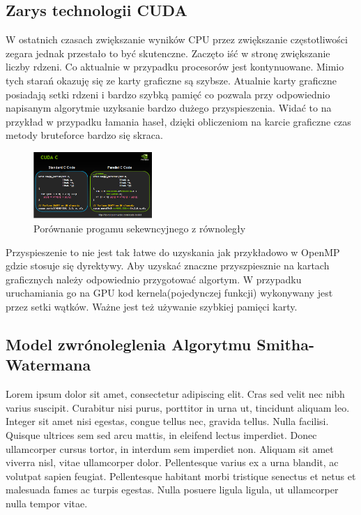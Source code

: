 \documentclass[a4paper,12pt]{article}
\begin{document}
\subsection*{Zarys technologii CUDA}
W ostatnich czasach zwiększanie wyników CPU przez zwiększanie częstotliwości zegara jednak przestało to być skutenczne. Zaczęto iść w stronę zwiększanie liczby rdzeni. Co aktualnie w przypadku procesorów jest kontynuowane. Mimio tych starań okazuję się ze karty graficzne są szybsze.
	Atualnie karty graficzne posiadają setki rdzeni i bardzo szybką pamięć co pozwala przy odpowiednio napisanym algorytmie uzyksanie bardzo dużego przyspieszenia. Widać to na przykład w przypadku łamania haseł, dzięki obliczeniom na karcie graficzne czas metody bruteforce bardzo się skraca. 
\begin{figure}[h]
  \vspace{5pt}
  \centering
  \begin{center}
  \includegraphics[width=0.4\textwidth]{images/cuda.png}
  \end{center}
  \caption{Porównanie progamu sekewncyjnego z równoległy }
 \end{figure}
 Przyspieszenie to nie jest tak łatwe do uzyskania jak przykładowo w OpenMP gdzie stosuje się dyrektywy. Aby uzyskać znaczne przyszpiesznie na kartach graficznych należy odpowiednio przygotować algortym. W przypadku uruchamiania go na GPU kod kernela(pojedynczej funkcji) wykonywany jest przez setki wątków. Ważne jest też używanie szybkiej pamięci karty.

\subsection*{Model zwrónoleglenia Algorytmu Smitha-Watermana}
Lorem ipsum dolor sit amet, consectetur adipiscing elit. Cras sed velit nec nibh varius suscipit. Curabitur nisi purus, porttitor in urna ut, tincidunt aliquam leo. Integer sit amet nisi egestas, congue tellus nec, gravida tellus. Nulla facilisi. Quisque ultrices sem sed arcu mattis, in eleifend lectus imperdiet. Donec ullamcorper cursus tortor, in interdum sem imperdiet non. Aliquam sit amet viverra nisl, vitae ullamcorper dolor. Pellentesque varius ex a urna blandit, ac volutpat sapien feugiat. Pellentesque habitant morbi tristique senectus et netus et malesuada fames ac turpis egestas. Nulla posuere ligula ligula, ut ullamcorper nulla tempor vitae.
\end{document}
